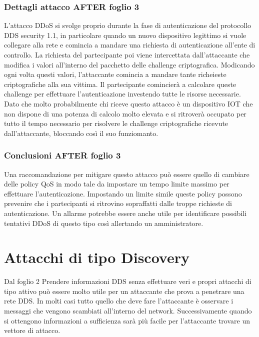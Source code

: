 \subsubsection{Dettagli attacco AFTER foglio 3}
L'attacco DDoS si svolge proprio durante la fase di autenticazione del protocollo
DDS security 1.1, in particolare quando un nuovo dispositivo legittimo si vuole 
collegare alla rete e comincia a mandare una richiesta di autenticazione
all'ente di controllo. La richiesta del partecipante poi viene intercettata 
dall'attaccante che modifica i valori all'interno del pacchetto delle 
challenge criptografica. Modicando ogni volta questi valori, l'attaccante
comincia a mandare tante richeieste criptografiche alla sua vittima.
Il partecipante comincierà a calcolare queste challenge per effettuare 
l'autenticazione investendo tutte le risorse necessarie.
Dato che molto probabilmente chi riceve questo attacco è un dispositivo IOT 
che non dispone di una potenza di calcolo molto elevata e si ritroverà
occupato per tutto il tempo necessario per risolvere le challenge criptografiche
ricevute dall'attaccante, bloccando così il suo funziomanto.

\subsubsection{Conclusioni AFTER foglio 3}
Una raccomandazione per mitigare questo attacco può essere quello di cambiare delle
policy QoS in modo tale da impostare un tempo limite massimo per effettuare
l'autenticazione. Impostando un limite simile queste policy possono prevenire
che i partecipanti si ritrovino sopraffatti dalle troppe richieste di 
autenticazione. Un allarme potrebbe essere anche utile per identificare possibili
tentativi DDoS di questo tipo così allertando un amministratore.

\section{Attacchi di tipo Discovery}
Dal foglio 2
Prendere informazioni DDS senza effettuare veri e propri
attacchi di tipo attivo può essere molto utile per un attaccante che prova
a penetrare una rete DDS. In molti casi tutto quello che deve fare l'attaccante
è osservare i messaggi che vengono scambiati all'interno del network.
Successivamente quando si ottengono informazioni a sufficienza sarà più
facile per l'attaccante trovare un vettore di attacco.


